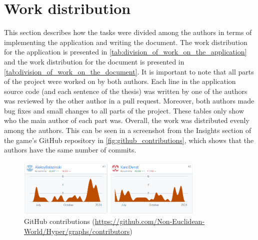 \section{Work distribution}\label{sec:division_of_work}
This section describes how the tasks were divided among the authors in terms of implementing the application and writing the document.
The work distribution for the application is presented in \autoref{tab:division_of_work_on_the_application} and the work distribution for the document is presented in \autoref{tab:division_of_work_on_the_document}.
It is important to note that all parts of the project were worked on by both authors.
Each line in the application source code (and each sentence of the thesis) was written by one of the authors was reviewed by the other author in a pull request.
Moreover, both authors made bug fixes and small changes to all parts of the project.
These tables only show who the main author of each part was.
Overall, the work was distributed evenly among the authors.
This can be seen in a screenshot from the Insights section of the game's GitHub repository in \autoref{fig:github_contributions}, which shows that the authors have the same number of commits.

\begin{figure}[!htb]
    \centering
    \includegraphics[width=0.8\textwidth]{chapters/introduction/work_distribution/resources/github_contributions.png}
    \caption{GitHub contributions (\url{https://github.com/Non-Euclidean-World/Hyper/graphs/contributors})}
    \label{fig:github_contributions}
\end{figure}

